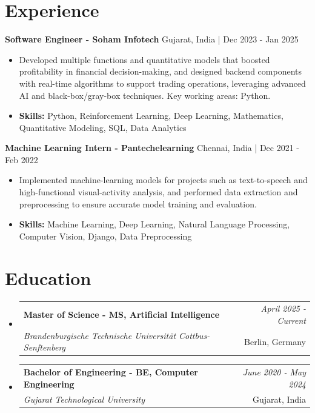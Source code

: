 \documentclass[a4paper,11pt]{article}
\makeatletter
\newcommand{\resumeSubheading}[4]{
\vspace{0.5mm}\item
    \begin{tabular*}{\linewidth}[t]{l@{\extracolsep{\fill}}r}
        \textbf{#1} & \textit{\footnotesize{#4}} \\
        \textit{\footnotesize{#3}} &  \footnotesize{#2}\\
    \end{tabular*}
    \vspace{-2.4mm}
}
\makeatother
\begin{document}
\section{\textbf{Experience}}


\vspace{1mm}
  \textbf{Software Engineer - Soham Infotech} \hfill Gujarat, India | Dec 2023 - Jan 2025
\vspace{-1.5mm} %
\begin{itemize}
  \item Developed multiple functions and quantitative models that boosted profitability in financial decision-making, and designed backend components with real-time algorithms to support trading operations, leveraging advanced AI and black-box/gray-box techniques. Key working areas: Python.

\vspace{-2mm}
  \item \textbf{Skills:} Python, Reinforcement Learning, Deep Learning, Mathematics, Quantitative Modeling, SQL, Data Analytics
\end{itemize}

\vspace{1mm}
  \textbf{Machine Learning Intern - Pantechelearning} \hfill Chennai, India | Dec 2021 - Feb 2022
\vspace{-1.5mm} %
\begin{itemize}
  \item Implemented machine-learning models for projects such as text-to-speech and high-functional visual-activity analysis, and performed data extraction and preprocessing to ensure accurate model training and evaluation.
\vspace{-2mm}
  \item \textbf{Skills:} Machine Learning, Deep Learning, Natural Language Processing, Computer Vision, Django, Data Preprocessing
\end{itemize}\section{\textbf{Education}}
\vspace{-0.4mm}

\begin{itemize}[leftmargin=0.15in, label={}]
\resumeSubheading
{Master of Science - MS, Artificial Intelligence }{Berlin, Germany}
{Brandenburgische Technische Universität Cottbus-Senftenberg  }{April 2025 - Current}

\vspace{1.0mm} %
\resumeSubheading
{Bachelor of Engineering - BE, Computer Engineering  }{Gujarat, India}
{Gujarat Technological University }{June 2020 - May 2024}

\end{itemize}
\end{document}
